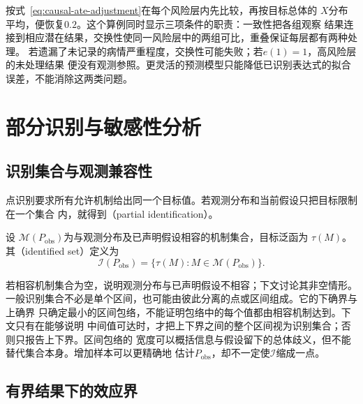 按式~\eqref{eq:causal-ate-adjustment}在每个风险层内先比较，再按目标总体的
\(X\)分布平均，便恢复\(0.2\)。这个算例同时显示三项条件的职责：一致性把各组观察
结果连接到相应潜在结果，交换性使同一风险层中的两组可比，重叠保证每层都有两种处理。
若遗漏了未记录的病情严重程度，交换性可能失败；若\(e(1)=1\)，高风险层的未处理结果
便没有观测参照。更灵活的预测模型只能降低已识别表达式的拟合误差，不能消除这两类问题。

\section{部分识别与敏感性分析}
\label{sec:causal-partial-identification-sensitivity}

\subsection{识别集合与观测兼容性}

点识别要求所有允许机制给出同一个目标值。若观测分布和当前假设只把目标限制在一个集合
内，就得到（partial identification）。
\begin{definition}[识别集合]
  \label{def:causal-identified-set}
设
\(\mathcal{M}(P_{\mathrm{obs}})\)为与观测分布及已声明假设相容的机制集合，目标泛函为
\(\tau(M)\)。其（identified set）定义为
\begin{equation}
  \mathcal{I}(P_{\mathrm{obs}})
  =
  \{\tau(M):M\in\mathcal{M}(P_{\mathrm{obs}})\}.
  \label{eq:causal-identified-set}
\end{equation}
\end{definition}
若相容机制集合为空，说明观测分布与已声明假设不相容；下文讨论其非空情形。一般识别集合不必是单个区间，也可能由彼此分离的点或区间组成。它的下确界与上确界
只确定最小的区间包络，不能证明包络中的每个值都由相容机制达到。下文只有在能够说明
中间值可达时，才把上下界之间的整个区间视为识别集合；否则只报告上下界。区间包络的
宽度可以概括信息与假设留下的总体歧义，但不能替代集合本身。增加样本可以更精确地
估计\(P_{\mathrm{obs}}\)，却不一定使\(\mathcal{I}\)缩成一点。

\subsection{有界结果下的效应界}

